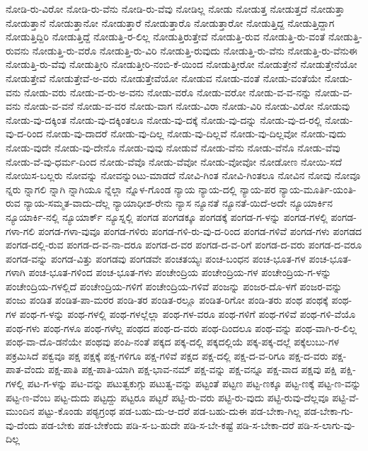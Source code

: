 {ನೋಡಿ-ರು-ವಿರೋ
ನೋಡಿ-ರು-ವೆನು
ನೋಡಿ-ರು-ವೆವು
ನೋಡಿಲ್ಲ
ನೋಡು
ನೋಡುತ್ತ
ನೋಡುತ್ತದೆ
ನೋಡುತ್ತಾ
ನೋಡುತ್ತಾನೆ
ನೋಡುತ್ತಾನೋ
ನೋಡುತ್ತಾರೆ
ನೋಡುತ್ತಾರೊ
ನೋಡುತ್ತಾರೋ
ನೋಡುತ್ತಿದ್ದ
ನೋಡುತ್ತಿದ್ದಾಗ
ನೋಡುತ್ತಿದ್ದಿರಿ
ನೋಡುತ್ತಿದ್ದೆ
ನೋಡುತ್ತಿ-ರ-ಲಿಲ್ಲ
ನೋಡುತ್ತಿರುತ್ತೇವೆ
ನೋಡುತ್ತಿ-ರುವ
ನೋಡುತ್ತಿ-ರು-ವಂತೆ
ನೋಡುತ್ತಿ-ರುವನು
ನೋಡುತ್ತಿ-ರು-ವರೊ
ನೋಡುತ್ತಿ-ರು-ವಿರಿ
ನೋಡುತ್ತಿ-ರುವುದು
ನೋಡುತ್ತಿ-ರು-ವೆನು
ನೋಡುತ್ತಿ-ರು-ವೆನುಈ
ನೋಡುತ್ತಿ-ರು-ವೆವು
ನೋಡುತ್ತೀರಿ
ನೋಡುತ್ತೀರಿ-ನಂಬಿ-ಕೆ-ಯಿಂದ
ನೋಡುತ್ತೀರೋ
ನೋಡುತ್ತೇನೆ
ನೋಡುತ್ತೇನೆಯೋ
ನೋಡುತ್ತೇವೆ
ನೋಡುತ್ತೇವೆ-ಅ-ವರು
ನೋಡುತ್ತೇವೆಯೋ
ನೋಡುವ
ನೋಡು-ವಂತೆ
ನೋಡು-ವಂತೆಯೇ
ನೋಡು-ವನು
ನೋಡು-ವರು
ನೋಡು-ವ-ರು-ಅ-ವನು
ನೋಡು-ವರೊ
ನೋಡು-ವರೋ
ನೋಡು-ವ-ವ-ನನ್ನು
ನೋಡು-ವ-ವನು
ನೋಡು-ವ-ವನೆ
ನೋಡು-ವ-ವರ
ನೋಡು-ವಾಗ
ನೋಡು-ವಿರಾ
ನೋಡು-ವಿರಿ
ನೋಡು-ವಿರೋ
ನೋಡುವು
ನೋಡು-ವು-ದಕ್ಕಿಂತ
ನೋಡು-ವು-ದಕ್ಕಿಂತಲೂ
ನೋಡು-ವು-ದಕ್ಕೆ
ನೋಡು-ವು-ದನ್ನು
ನೋಡು-ವು-ದ-ರಲ್ಲಿ
ನೋಡು-ವು-ದ-ರಿಂದ
ನೋಡು-ವು-ದಾದರೆ
ನೋಡು-ವು-ದಿಲ್ಲ
ನೋಡು-ವು-ದಿಲ್ಲವೆ
ನೋಡು-ವು-ದಿಲ್ಲವೋ
ನೋಡು-ವುದು
ನೋಡು-ವುದೇ
ನೋಡು-ವು-ದೇನೊ
ನೋಡು-ವುವು
ನೋಡುವೆ
ನೋಡು-ವೆನು
ನೋಡು-ವೆನೊ
ನೋಡು-ವೆವು
ನೋಡು-ವೆ-ವು-ಧರ್ಮ-ದಿಂದ
ನೋಡು-ವೆವೊ
ನೋಡು-ವೆವೋ
ನೋಡು-ವೋವೋ
ನೋಡೋಣ
ನೋಯಿ-ಸದೆ
ನೋಯಿಸ-ಬಲ್ಲರು
ನೋವನ್ನು
ನೋವನ್ನುಂಟು-ಮಾಡದೆ
ನೋವಿ-ಗಿಂತ
ನೋವಿ-ಗಿಂತಲೂ
ನೋವಿನ
ನೋವು
ನೋವೂ
ನ್ನರು
ನ್ನಾಗಲಿ
ನ್ನಾಗಿ
ನ್ನಾಗಿಯೂ
ನ್ನೆಲ್ಲಾ
ನ್ನೊಳ-ಗೊಂಡ
ನ್ಯಾಯ
ನ್ಯಾಯ-ದಲ್ಲಿ
ನ್ಯಾಯ-ಪರ
ನ್ಯಾಯ-ಮೂರ್ತಿ-ಯಂತಿ-ರುವ
ನ್ಯಾಯ-ಸಮ್ಮತ-ವಾದು-ದೆಲ್ಲ
ನ್ಯಾಯಾಧೀಶ-ರೇನು
ನ್ಯಾಸ
ನ್ಯೂನತೆ
ನ್ಯೂನತೆ-ಯಿದೆ-ಅದೇ
ನ್ಯೂಯಾರ್ಕಿನ
ನ್ಯೂಯಾರ್ಕಿ-ನಲ್ಲಿ
ನ್ಯೂಯಾರ್ಕ್
ನ್ಯೂಸ್ನಲ್ಲಿ
ಪಂಗಡ
ಪಂಗಡಕ್ಕೂ
ಪಂಗಡಕ್ಕೆ
ಪಂಗಡ-ಗ-ಳನ್ನು
ಪಂಗಡ-ಗಳಲ್ಲಿ
ಪಂಗಡ-ಗಳಾ-ಗಲಿ
ಪಂಗಡ-ಗಳಾ-ವುವೂ
ಪಂಗಡ-ಗಳಿರು
ಪಂಗಡ-ಗಳಿ-ರು-ವು-ದ-ರಿಂದ
ಪಂಗಡ-ಗಳಿವೆ
ಪಂಗಡ-ಗಳು
ಪಂಗಡದ
ಪಂಗಡ-ದಲ್ಲಿ-ರುವ
ಪಂಗಡ-ದ-ವ-ನಾ-ದರೂ
ಪಂಗಡ-ದ-ವರ
ಪಂಗಡ-ದ-ವ-ರಿಗೆ
ಪಂಗಡ-ದ-ವರು
ಪಂಗಡ-ದ-ವರೂ
ಪಂಗಡ-ವನ್ನು
ಪಂಗಡ-ವಿತ್ತು
ಪಂಗಡವು
ಪಂಗಡವೇ
ಪಂಚತಯ್ಯಃ
ಪಂಚ-ಬಂಧನ
ಪಂಚ-ಭೂತ-ಗಳ
ಪಂಚ-ಭೂತ-ಗಳಾಗಿ
ಪಂಚ-ಭೂತ-ಗಳಿಂದ
ಪಂಚ-ಭೂತ-ಗಳು
ಪಂಚೇಂದ್ರಿಯ
ಪಂಚೇಂದ್ರಿಯ-ಗಳ
ಪಂಚೇಂದ್ರಿಯ-ಗ-ಳನ್ನು
ಪಂಚೇಂದ್ರಿಯ-ಗಳಲ್ಲಿದೆ
ಪಂಚೇಂದ್ರಿಯ-ಗಳಿಗೆ
ಪಂಚೇಂದ್ರಿಯ-ಗಳಿವೆ
ಪಂಜನ್ನು
ಪಂಜರ-ದೊ-ಳಗೆ
ಪಂಜರ-ವನ್ನು
ಪಂಜು
ಪಂಡಿತ
ಪಂಡಿತ-ಪಾ-ಮರರ
ಪಂಡಿ-ತರ
ಪಂಡಿತ-ರಲ್ಲೂ
ಪಂಡಿತ-ರಿಗೋ
ಪಂಡಿ-ತರು
ಪಂಥ
ಪಂಥಕ್ಕೆ
ಪಂಥ-ಗಳ
ಪಂಥ-ಗ-ಳನ್ನು
ಪಂಥ-ಗಳಲ್ಲಿ
ಪಂಥ-ಗಳಲ್ಲೆಲ್ಲಾ
ಪಂಥ-ಗಳ-ವರೂ
ಪಂಥ-ಗಳಿಗೆ
ಪಂಥ-ಗಳಿವೆ
ಪಂಥ-ಗಳಿ-ವೆಯೊ
ಪಂಥ-ಗಳು
ಪಂಥ-ಗಳೂ
ಪಂಥ-ಗಳೆಲ್ಲ
ಪಂಥದ
ಪಂಥ-ದ-ವರು
ಪಂಥ-ದಿಂದಲೂ
ಪಂಥ-ವನ್ನು
ಪಂಥ-ವಾಗಿ-ರ-ಲಿಲ್ಲ
ಪಂಥ-ವಾ-ದೊ-ಡನೆಯೇ
ಪಂಥವು
ಪಂಪಿ-ನಂತೆ
ಪಕ್ಕದ
ಪಕ್ಕ-ದಲ್ಲಿ
ಪಕ್ಕದಲ್ಲಿಯೆ
ಪಕ್ಕ-ಪಕ್ಕ-ದಲ್ಲೆ
ಪಕ್ಕೆಲುಬು-ಗಳ
ಪಕ್ರಮಿಸಿದೆ
ಪಕ್ವವೂ
ಪಕ್ಷ
ಪಕ್ಷಕ್ಕೆ
ಪಕ್ಷ-ಗಳಿಗೂ
ಪಕ್ಷ-ಗಳಿವೆ
ಪಕ್ಷದ
ಪಕ್ಷ-ದಲ್ಲಿ
ಪಕ್ಷ-ದ-ವ-ರಿಗೂ
ಪಕ್ಷ-ದ-ವರು
ಪಕ್ಷ-ಪಾತ-ವೆಂದು
ಪಕ್ಷ-ಪಾತಿ
ಪಕ್ಷ-ಪಾತಿ-ಯಾಗಿ
ಪಕ್ಷ-ಭಾವ-ನಮ್
ಪಕ್ಷ-ವನ್ನು
ಪಕ್ಷ-ವನ್ನೂ
ಪಕ್ಷ-ವಾದ
ಪಕ್ಷವು
ಪಕ್ಷಿ
ಪಕ್ಷಿ-ಗಳಲ್ಲಿ
ಪಟ-ಗ-ಳನ್ನು
ಪಟ-ವನ್ನು
ಪಟುತ್ವಕುಗ್ಗು
ಪಟುತ್ವ-ವನ್ನು
ಪಟ್ಟಂತೆ
ಪಟ್ಟಣ
ಪಟ್ಟ-ಣಕ್ಕೂ
ಪಟ್ಟ-ಣಕ್ಕೆ
ಪಟ್ಟ-ಣ-ವನ್ನು
ಪಟ್ಟ-ಣ-ವೆಂಬ
ಪಟ್ಟ-ದುದು
ಪಟ್ಟದ್ದು
ಪಟ್ಟರೂ
ಪಟ್ಟರೆ
ಪಟ್ಟಿ-ರು-ವರು
ಪಟ್ಟಿ-ರು-ವುದು
ಪಟ್ಟಿ-ರುವು-ದೆಲ್ಲವೂ
ಪಟ್ಟಿ-ವೆ-ಮುಂದಿನ
ಪಟ್ಟು-ಕೊಂಡು
ಪಠ್ಯಗ್ರಂಥ
ಪಡ-ಬಹು-ದು-ಆ-ದರೆ
ಪಡ-ಬಹು-ದುಈ
ಪಡ-ಬೇಕಾ-ಗಿಲ್ಲ
ಪಡ-ಬೇಕಾ-ಗು-ವು-ದೆಂದು
ಪಡ-ಬೇಕು
ಪಡ-ಬೇಕೆಂದು
ಪಡಿ-ಸ-ಬ-ಹುದೇ
ಪಡಿ-ಸ-ಬೇ-ಕಷ್ಟೆ
ಪಡಿ-ಸ-ಬೇಕಾ-ದರೆ
ಪಡಿ-ಸ-ಲಾಗು-ವು-ದಿಲ್ಲ
}
